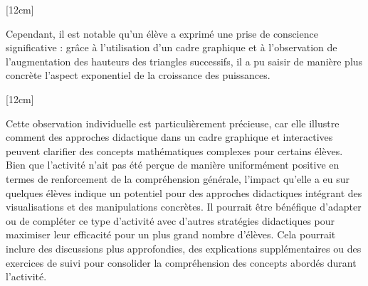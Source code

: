 [12cm]

Cependant,
il est notable qu'un élève a exprimé une prise de conscience significative :
grâce à l'utilisation d'un cadre graphique et à l'observation de l'augmentation des hauteurs des triangles successifs,
il a pu saisir de manière plus concrète l'aspect exponentiel de la croissance des puissances.

[12cm]

Cette observation individuelle est particulièrement précieuse,
car elle illustre comment des approches didactique dans un cadre graphique et interactives peuvent clarifier des concepts mathématiques complexes pour certains élèves.\\

Bien que l'activité n'ait pas été perçue de manière uniformément positive en termes de renforcement de la compréhension générale,
l'impact qu'elle a eu sur quelques élèves indique un potentiel pour des approches didactiques intégrant des visualisations et des manipulations concrètes.
Il pourrait être bénéfique d'adapter ou de compléter ce type d'activité avec d'autres stratégies didactiques pour maximiser leur efficacité pour un plus grand nombre d'élèves.
Cela pourrait inclure des discussions plus approfondies,
des explications supplémentaires ou des exercices de suivi pour consolider la compréhension des concepts abordés durant l'activité.
